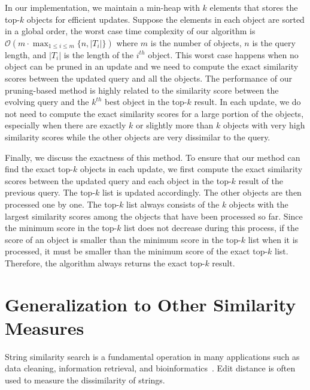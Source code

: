  

In our implementation, we maintain a min-heap with $k$ elements that stores the top-$k$ objects for efficient updates. Suppose the elements in each object are sorted in a global order, the worst case time complexity of our algorithm is $\mathcal{O}(m\cdot \displaystyle\max_{1 \leq i \leq m}\{n, |T_i|\})$ where $m$ is the number of objects, $n$ is the query length, and $|T_i|$ is the length of the $i^{th}$ object. This worst case happens when no object can be pruned in an update and we need to compute the exact similarity scores between the updated query and all the objects. 
The performance of our pruning-based method is highly related to the similarity score between the evolving query and the $k^{th}$ best object in the top-$k$ result. In each update, we do not need to compute the exact similarity scores for a large portion of the objects, especially when there are exactly $k$ or slightly more than $k$ objects with very high similarity scores while the other objects are very dissimilar to the query. 

Finally, we discuss the exactness of this method. To ensure that our method can find the exact top-$k$ objects in each update, we first compute the exact similarity scores between the updated query and each object in the top-$k$ result of the previous query. The top-$k$ list is updated accordingly. The other objects are then processed one by one. The top-$k$ list always consists of the $k$ objects with the largest similarity scores among the objects that have been processed so far. Since the minimum score in the top-$k$ list does not decrease during this process, if the score of an object is smaller than the minimum score in the top-$k$ list when it is processed, it must be smaller than the minimum score of the exact top-$k$ list. Therefore, the algorithm always returns the exact top-$k$ result. 

\section{Generalization to Other Similarity Measures}
\label{sec:gen-sim}
String similarity search is a fundamental operation in many applications such as data cleaning, information retrieval, and bioinformatics~\cite{DLFL13}. Edit distance is often used to measure the dissimilarity of strings.

